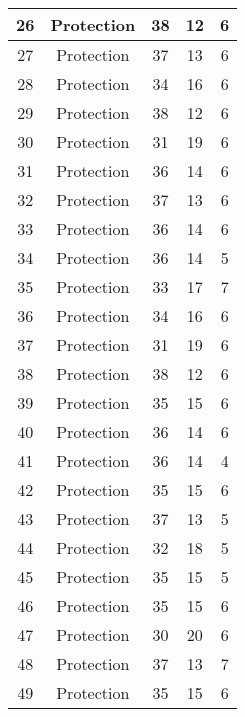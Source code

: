 \documentclass[results.tex]{subfiles}
\begin{document}
\begin{center}
\begin{tabular}{| c || c | c | c | c |}
    \hline
    26 & Protection & 38 & 12 & 6 \\ 
    \hline
    27 & Protection & 37 & 13 & 6 \\ 
    \hline
    28 & Protection & 34 & 16 & 6 \\ 
    \hline
    29 & Protection & 38 & 12 & 6 \\ 
    \hline
    30 & Protection & 31 & 19 & 6 \\ 
    \hline
    31 & Protection & 36 & 14 & 6 \\ 
    \hline
    32 & Protection & 37 & 13 & 6 \\ 
    \hline
    33 & Protection & 36 & 14 & 6 \\ 
    \hline
    34 & Protection & 36 & 14 & 5 \\ 
    \hline
    35 & Protection & 33 & 17 & 7 \\ 
    \hline
    36 & Protection & 34 & 16 & 6 \\ 
    \hline
    37 & Protection & 31 & 19 & 6 \\ 
    \hline
    38 & Protection & 38 & 12 & 6 \\ 
    \hline
    39 & Protection & 35 & 15 & 6 \\ 
    \hline
    40 & Protection & 36 & 14 & 6 \\ 
    \hline
    41 & Protection & 36 & 14 & 4 \\ 
    \hline
    42 & Protection & 35 & 15 & 6 \\ 
    \hline
    43 & Protection & 37 & 13 & 5 \\ 
    \hline
    44 & Protection & 32 & 18 & 5 \\ 
    \hline
    45 & Protection & 35 & 15 & 5 \\ 
    \hline
    46 & Protection & 35 & 15 & 6 \\ 
    \hline
    47 & Protection & 30 & 20 & 6 \\ 
    \hline
    48 & Protection & 37 & 13 & 7 \\ 
    \hline
    49 & Protection & 35 & 15 & 6 \\ 
    \hline   \end{tabular}
\end{center}
\end{document}
